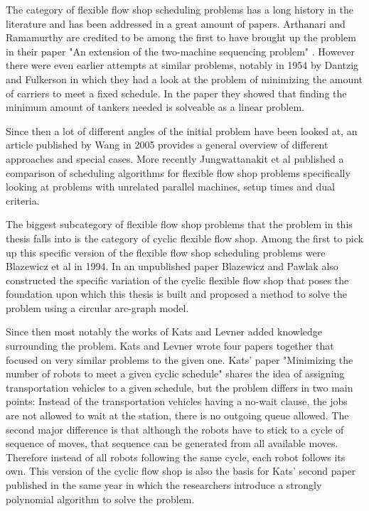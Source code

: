 The category of flexible flow shop scheduling problems has a long history in the literature and has been addressed in a great amount of papers. Arthanari and Ramamurthy are credited to be among the first to have brought up the problem in their paper "An extension of the two-machine sequencing problem" \cite{arth1971}. However there were even earlier attempts at similar problems, notably in 1954 by Dantzig and Fulkerson \cite{dantzig1954} in which they had a look at the problem of minimizing the amount of carriers to meet a fixed schedule. In the paper they showed that finding the minimum amount of tankers needed is solveable as a linear problem.

Since then a lot of different angles of the initial problem have been looked at, an article published by Wang \cite{wang2005} in 2005 provides a general overview of different approaches and special cases. More recently Jungwattanakit et al \cite{jung2009} published a comparison of scheduling algorithms for flexible flow shop problems specifically looking at problems with unrelated parallel machines, setup times and dual criteria.

The biggest subcategory of flexible flow shop problems that the problem in this thesis falls into is the category of cyclic flexible flow shop. Among the first to pick up this specific version of the flexible flow shop scheduling problems were Blazewicz et al \cite{blazewicz1994} in 1994. In an unpublished paper Blazewicz and Pawlak also constructed the specific variation of the cyclic flexible flow shop that poses the foundation upon which this thesis is built \cite{blazewicz1111} and proposed a method to solve the problem using a circular arc-graph model.\cite{blazewicz198}

Since then most notably the works of Kats and Levner added knowledge surrounding the problem. Kats and Levner wrote four papers together that focused on very similar problems to the given one. Kats' paper "Minimizing the number of robots to meet a given cyclic schedule" \cite{kats1997b} shares the idea of assigning transportation vehicles to a given schedule, but the problem differs in two main points: Instead of the transportation vehicles having a no-wait clause, the jobs are not allowed to wait at the station, there is no outgoing queue allowed. The second major difference is that although the robots have to stick to a cycle of sequence of moves, that sequence can be generated from all available moves. Therefore instead of all robots following the same cycle, each robot follows its own. This version of the cyclic flow shop is also the basis for Kats' second paper published in the same year \cite{kats1997a} in which the researchers introduce a strongly polynomial algorithm to solve the problem.

